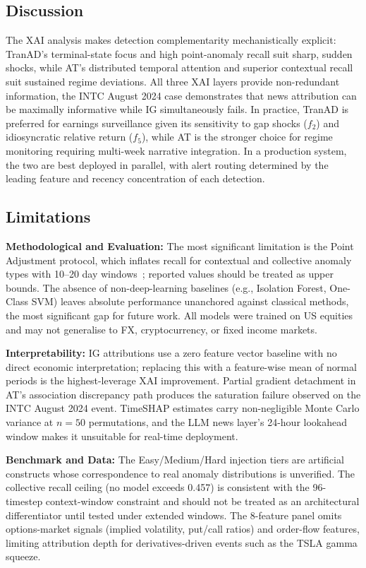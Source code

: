 \documentclass{llncs}
\begin{document}
\subsection{Discussion}

The XAI analysis makes detection complementarity mechanistically explicit: TranAD's terminal-state focus and high point-anomaly recall suit sharp, sudden shocks, while AT's distributed temporal attention and superior contextual recall suit sustained regime deviations. All three XAI layers provide non-redundant information, the INTC August 2024 case demonstrates that news attribution can be maximally informative while IG simultaneously fails. In practice, TranAD is preferred for earnings surveillance given its sensitivity to gap shocks ($f_2$) and idiosyncratic relative return ($f_5$), while AT is the stronger choice for regime monitoring requiring multi-week narrative integration. In a production system, the two are best deployed in parallel, with alert routing determined by the leading feature and recency concentration of each detection.

\subsection{Limitations}

\textbf{Methodological and Evaluation:} The most significant limitation is the Point Adjustment protocol, which inflates recall for contextual and collective anomaly types with 10--20 day windows~\cite{ref14,ref4}; reported values should be treated as upper bounds. The absence of non-deep-learning baselines (e.g., Isolation Forest, One-Class SVM) leaves absolute performance unanchored against classical methods, the most significant gap for future work. All models were trained on US equities and may not generalise to FX, cryptocurrency, or fixed income markets.

\textbf{Interpretability:} IG attributions use a zero feature vector baseline with no direct economic interpretation; replacing this with a feature-wise mean of normal periods is the highest-leverage XAI improvement. Partial gradient detachment in AT's association discrepancy path produces the saturation failure observed on the INTC August 2024 event. TimeSHAP estimates carry non-negligible Monte Carlo variance at $n = 50$ permutations, and the LLM news layer's 24-hour lookahead window makes it unsuitable for real-time deployment.

\textbf{Benchmark and Data:} The Easy/Medium/Hard injection tiers are artificial constructs whose correspondence to real anomaly distributions is unverified. The collective recall ceiling (no model exceeds 0.457) is consistent with the 96-timestep context-window constraint and should not be treated as an architectural differentiator until tested under extended windows. The 8-feature panel omits options-market signals (implied volatility, put/call ratios) and order-flow features, limiting attribution depth for derivatives-driven events such as the TSLA gamma squeeze.
\end{document}
